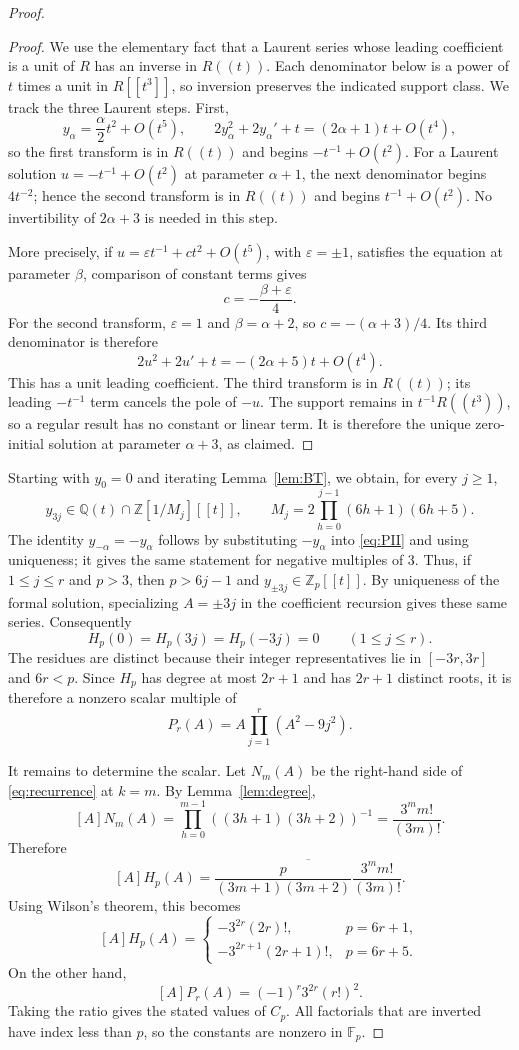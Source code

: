 \documentclass[11pt,a4paper,reqno]{amsart}
\theoremstyle{definition}
\theoremstyle{remark}
\newcommand{\Q}{\mathbb Q}
\newcommand{\Z}{\mathbb Z}
\newcommand{\F}{\mathbb F}
\begin{document}
\begin{proof}
\begin{proof}
We use the elementary fact that a Laurent series whose leading coefficient is a unit of $R$ has an inverse in $R((t))$. Each denominator below is a power of $t$ times a unit in $R[[t^3]]$, so inversion preserves the indicated support class. We track the three Laurent steps. First,
\[
 y_\alpha=\frac\alpha2t^2+O(t^5),\qquad
 2y_\alpha^2+2y_\alpha'+t=(2\alpha+1)t+O(t^4),
\]
so the first transform is in $R((t))$ and begins $-t^{-1}+O(t^2)$. For a Laurent solution $u=-t^{-1}+O(t^2)$ at parameter $\alpha+1$, the next denominator begins $4t^{-2}$; hence the second transform is in $R((t))$ and begins $t^{-1}+O(t^2)$. No invertibility of $2\alpha+3$ is needed in this step.

More precisely, if $u=\varepsilon t^{-1}+c t^2+O(t^5)$, with $\varepsilon=\pm1$, satisfies the equation at parameter $\beta$, comparison of constant terms gives
\[
 c=-\frac{\beta+\varepsilon}{4}.
\]
For the second transform, $\varepsilon=1$ and $\beta=\alpha+2$, so $c=-(\alpha+3)/4$. Its third denominator is therefore
\[
 2u^2+2u'+t=-(2\alpha+5)t+O(t^4).
\]
This has a unit leading coefficient. The third transform is in $R((t))$; its leading $-t^{-1}$ term cancels the pole of $-u$. The support remains in $t^{-1}R((t^3))$, so a regular result has no constant or linear term. It is therefore the unique zero-initial solution at parameter $\alpha+3$, as claimed.
\end{proof}

Starting with $y_0=0$ and iterating Lemma~\ref{lem:BT}, we obtain, for every $j\ge1$,
\[
 y_{3j}\in\Q(t)\cap\Z[1/M_j][[t]],\qquad
 M_j=2\prod_{h=0}^{j-1}(6h+1)(6h+5).
\]
The identity $y_{-\alpha}=-y_\alpha$ follows by substituting $-y_\alpha$ into \eqref{eq:PII} and using uniqueness; it gives the same statement for negative multiples of $3$. Thus, if $1\le j\le r$ and $p>3$, then $p>6j-1$ and $y_{\pm3j}\in\Z_p[[t]]$. By uniqueness of the formal solution, specializing $A=\pm3j$ in the coefficient recursion gives these same series. Consequently
\[
 H_p(0)=H_p(3j)=H_p(-3j)=0\qquad(1\le j\le r).
\]
The residues are distinct because their integer representatives lie in $[-3r,3r]$ and $6r<p$. Since $H_p$ has degree at most $2r+1$ and has $2r+1$ distinct roots, it is therefore a nonzero scalar multiple of
\[
 P_r(A)=A\prod_{j=1}^{r}(A^2-9j^2).
\]

It remains to determine the scalar. Let $N_m(A)$ be the right-hand side of \eqref{eq:recurrence} at $k=m$. By Lemma~\ref{lem:degree},
\[
 [A]N_m(A)=\prod_{h=0}^{m-1}((3h+1)(3h+2))^{-1}
 =\frac{3^m m!}{(3m)!}.
\]
Therefore
\[
 [A]H_p(A)=\overline{\frac{p}{(3m+1)(3m+2)}\frac{3^m m!}{(3m)!}}.
\]
Using Wilson's theorem, this becomes
\[
 [A]H_p(A)=
 \begin{cases}
 -3^{2r}(2r)!,&p=6r+1,\\
 -3^{2r+1}(2r+1)!,&p=6r+5.
 \end{cases}
\]
On the other hand,
\[
 [A]P_r(A)=(-1)^r3^{2r}(r!)^2.
\]
Taking the ratio gives the stated values of $C_p$. All factorials that are inverted have index less than $p$, so the constants are nonzero in $\F_p$.
\end{proof}
\end{document}
